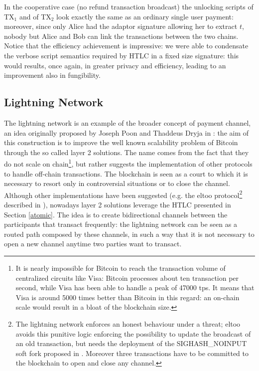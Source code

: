 In the cooperative case (no refund transaction broadcast) the unlocking scripts of TX$_1$ and of TX$_2$ look exactly the same as an ordinary single user payment: moreover, since only Alice had the adaptor signature allowing her to extract $t$, nobody but Alice and Bob can link the transactions between the two chains.
\\
Notice that the efficiency achievement is impressive: we were able to condensate the verbose script semantics required by HTLC in a fixed size signature: this would results, once again, in greater privacy and efficiency, leading to an improvement also in fungibility.

\bigskip

\subsection{Lightning Network}
The lightning network is an example of the broader concept of payment channel, an idea originally proposed by Joseph Poon and Thaddeus Dryja in \cite{RefWork:18}: the aim of this construction is to improve the well known scalability problem of Bitcoin through the so called layer 2 solutions. The name comes from the fact that they do not scale on chain\footnote{It is nearly impossible for Bitcoin to reach the transaction volume of centralized circuits like Visa: Bitcoin processes about ten transaction per second, while Visa has been able to handle a peak of 47000 tps. It means that Visa is around 5000 times better than Bitcoin in this regard: an on-chain scale would result in a bloat of the blockchain size.}, but rather suggests the implementation of other protocols to handle off-chain transactions. The blockchain is seen as a court to which it is necessary to resort only in controversial situations or to close the channel. Although other implementations have been suggested (e.g. the eltoo protocol\footnote{The lightning network enforces an honest behaviour under a threat; eltoo avoids this punitive logic enforcing the possibility to update the broadcast of an old transaction, but needs the deployment of the SIGHASH\_NOINPUT soft fork proposed in \cite{BIP5}. Moreover three transactions have to be committed to the blockchain to open and close any channel.} described in \cite{RefWork:19}), nowadays layer 2 solutions leverage the HTLC presented in Section \ref{atomic}. The idea is to create bidirectional channels between the participants that transact frequently: the lightning network can be seen as a routed path composed by these channels, in such a way that it is not necessary to open a new channel anytime two parties want to transact.
